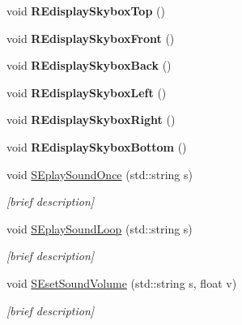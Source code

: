 \begin{DoxyCompactItemize}
\item 
\hypertarget{class_i_s_e_a3995394820dde705196542772fe65ad1}{void {\bfseries R\-Edisplay\-Skybox\-Top} ()}\label{class_i_s_e_a3995394820dde705196542772fe65ad1}

\item 
\hypertarget{class_i_s_e_a2a53a33ba3a5a57aa4bbdafcba8766f6}{void {\bfseries R\-Edisplay\-Skybox\-Front} ()}\label{class_i_s_e_a2a53a33ba3a5a57aa4bbdafcba8766f6}

\item 
\hypertarget{class_i_s_e_abac18e70e4bb90c1253f543ff7e54bbe}{void {\bfseries R\-Edisplay\-Skybox\-Back} ()}\label{class_i_s_e_abac18e70e4bb90c1253f543ff7e54bbe}

\item 
\hypertarget{class_i_s_e_af200ba289ca1728073032ef4af5b89f5}{void {\bfseries R\-Edisplay\-Skybox\-Left} ()}\label{class_i_s_e_af200ba289ca1728073032ef4af5b89f5}

\item 
\hypertarget{class_i_s_e_a20dfa7470d6ac6b9fdcc4e35dfa445cf}{void {\bfseries R\-Edisplay\-Skybox\-Right} ()}\label{class_i_s_e_a20dfa7470d6ac6b9fdcc4e35dfa445cf}

\item 
\hypertarget{class_i_s_e_a4c7a9ac44007c892e98225963373810f}{void {\bfseries R\-Edisplay\-Skybox\-Bottom} ()}\label{class_i_s_e_a4c7a9ac44007c892e98225963373810f}

\item 
void \hyperlink{class_i_s_e_a2e941e2d1d4d1dc483211a4948c3d56d}{S\-Eplay\-Sound\-Once} (std\-::string s)
\begin{DoxyCompactList}\small\item\em \mbox{[}brief description\mbox{]} \end{DoxyCompactList}\item 
void \hyperlink{class_i_s_e_aec44f930437bff8d7037fc5a87cc4a4d}{S\-Eplay\-Sound\-Loop} (std\-::string s)
\begin{DoxyCompactList}\small\item\em \mbox{[}brief description\mbox{]} \end{DoxyCompactList}\item 
void \hyperlink{class_i_s_e_af939f967fa61d69444e7ad9e9b860ff1}{S\-Eset\-Sound\-Volume} (std\-::string s, float v)
\begin{DoxyCompactList}\small\item\em \mbox{[}brief description\mbox{]} \end{DoxyCompactList}\end{DoxyCompactItemize}


